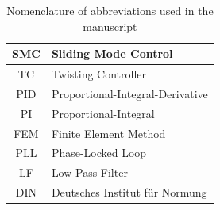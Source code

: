 \documentclass[preprint,12pt]{elsarticle}
\begin{document}
\begin{table}[h]
    \centering
    \begin{tabular}{|c|l|}
        \hline
        SMC & Sliding Mode Control \\ \hline
        TC & Twisting Controller \\ \hline
        PID & Proportional-Integral-Derivative \\ \hline
        PI & Proportional-Integral \\ \hline
        FEM & Finite Element Method \\ \hline
        PLL & Phase-Locked Loop \\ \hline
        LF & Low-Pass Filter \\ \hline
        DIN & Deutsches Institut für Normung \\ \hline
    \end{tabular}
    \vspace{0.1cm}
    \caption{Nomenclature of abbreviations used in the manuscript}
    \label{T_nomenclature}
\end{table}
\end{document}
